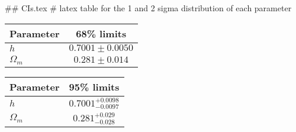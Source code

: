 ## CIs.tex
# latex table for the 1 and 2 sigma distribution of each parameter

\begin{tabular} { l  c}
 Parameter &  68\% limits\\
\hline
{\boldmath$h              $} & $0.7001\pm 0.0050          $\\
{\boldmath$\Omega_m       $} & $0.281\pm 0.014            $\\
\hline
\end{tabular}

\begin{tabular} { l  c}
 Parameter &  95\% limits\\
\hline
{\boldmath$h              $} & $0.7001^{+0.0098}_{-0.0097}$\\
{\boldmath$\Omega_m       $} & $0.281^{+0.029}_{-0.028}   $\\
\hline
\end{tabular}
